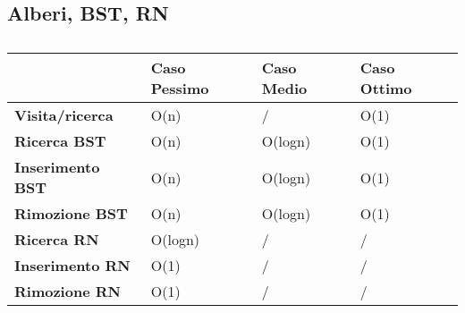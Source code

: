 \documentclass[10pt]{article}
\begin{document}
\subsection{Alberi, BST, RN}
\begin{table}[H]
\begin{tabular}{|l|l|l|l|}
\hline
\textbf{}                & \textbf{Caso Pessimo} & \textbf{Caso Medio} & \textbf{Caso Ottimo} \\ \hline
\textbf{Visita/ricerca}  & O(n)                  & /                   & O(1)                 \\ \hline
\textbf{Ricerca BST}     & O(n)                  & O(logn)             & O(1)                 \\ \hline
\textbf{Inserimento BST} & O(n)                  & O(logn)             & O(1)                 \\ \hline
\textbf{Rimozione BST}   & O(n)                  & O(logn)             & O(1)                 \\ \hline
\textbf{Ricerca RN}      & O(logn)               & /                   & /                    \\ \hline
\textbf{Inserimento RN}  & O(1)                  & /                   & /                    \\ \hline
\textbf{Rimozione RN}    & O(1)                  & /                   & /                    \\ \hline
\end{tabular}
\caption{}
\label{tab:my-table}
\end{table}
\end{document}
